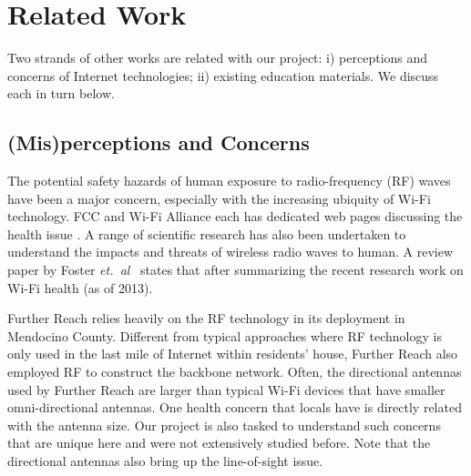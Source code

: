 \section{Related Work}
\label{sec:related-work}

Two strands of other works are related with our project: i) perceptions and
concerns of Internet technologies; ii) existing education materials. We discuss
each in turn below.

\subsection{(Mis)perceptions and Concerns}
\label{sec:conc-misp}

The potential safety hazards of human exposure to radio-frequency (RF) waves
have been a major concern, especially with the increasing ubiquity of Wi-Fi
technology. FCC and Wi-Fi Alliance each has dedicated web pages discussing the
health issue \cite{fcc2015radio, wifi2015health}. A range of scientific research
has also been undertaken to understand the impacts and threats of wireless radio
waves to human. A review paper by Foster {\em et.~al}~\cite{foster2013wi} states
that 
after summarizing the recent research work on Wi-Fi health (as of 2013).

Further Reach relies heavily on the RF technology in its deployment in Mendocino
County. Different from typical approaches where RF technology is only used in
the last mile of Internet within residents' house, Further Reach also employed
RF to construct the backbone network. Often, the directional antennas used by
Further Reach are larger than typical Wi-Fi devices that have smaller
omni-directional antennas. One health concern that locals have is directly
related with the antenna size. Our project is also tasked to understand such
concerns that are unique here and were not extensively studied before. Note that
the directional antennas also bring up the line-of-sight issue.

